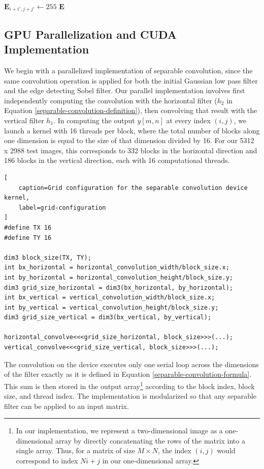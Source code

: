 \documentclass[journal]{IEEEtran}
\begin{document}
\begin{algorithm}[h]
{{			\nl {} {
				 {
					 {
						\nl {} {
							\nl $\boldsymbol{E}_{i + i', j + j'} \gets 255$\;
						}
					}
				}
			}
		}
	}
	\nl \Return $\boldsymbol{E}$\;
	\
\end{algorithm}

\subsection{GPU Parallelization and CUDA Implementation}
We begin with a parallelized implementation of separable convolution, since the same convolution operation is applied for both the initial Gaussian low pass filter and the edge detecting Sobel filter. Our parallel implementation involves first independently computing the convolution with the horizontal filter ($h_2$ in Equation \eqref{separable-convolution-definition}), then convolving that result with the vertical filter $h_1$. In computing the output $y[m, n]$ at every index $(i, j)$, we launch a kernel with 16 threads per block, where the total number of blocks along one dimension is equal to the size of that dimension divided by 16. For our 5312 x 2988 test images, this corresponds to 332 blocks in the horizontal direction and 186 blocks in the vertical direction, each with 16 computational threads.
\begin{lstlisting}[
	caption=Grid configuration for the separable convolution device kernel,
	label=grid-configuration
]
#define TX 16
#define TY 16

dim3 block_size(TX, TY);
int bx_horizontal = horizontal_convolution_width/block_size.x;
int by_horizontal = horizontal_convolution_height/block_size.y;
dim3 grid_size_horizontal = dim3(bx_horizontal, by_horizontal);
int bx_vertical = vertical_convolution_width/block_size.x;
int by_vertical = vertical_convolution_height/block_size.y;
dim3 grid_size_vertical = dim3(bx_vertical, by_vertical);

horizontal_convolve<<<grid_size_horizontal, block_size>>>(...);
vertical_convolve<<<grid_size_vertical, block_size>>>(...);
\end{lstlisting}
\par The convolution on the device executes only one serial loop across the dimensions of the filter exactly as it is defined in Equation \eqref{separable-convolution-formula}. This sum is then stored in the output array\footnote{In our implementation, we represent a two-dimensional image as a one-dimensional array by directly concatenating the rows of the matrix into a single array. Thus, for a matrix of size $M \times N$, the index $(i, j)$ would correspond to index $Ni + j$ in our one-dimensional array.} according to the block index, block size, and thread index. The implementation is modularized so that any separable filter can be applied to an input matrix.
\end{document}
